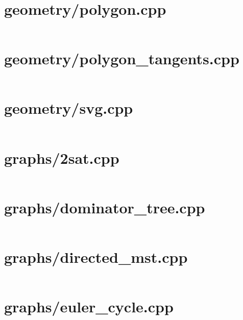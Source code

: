 \newpage
\section{geometry/polygon.cpp}
\fontsize{7.9}{8.5}\selectfont
\inputminted[numbersep=1pt,linenos,breaklines]{c++}{/home/ifsmirnov/olymp/teambook/tmp.qSsNloJNks/tmp.1aqEZOeitx}

\newpage
\section{geometry/polygon\_tangents.cpp}
\fontsize{7.9}{8.5}\selectfont
\inputminted[numbersep=1pt,linenos,breaklines]{c++}{/home/ifsmirnov/olymp/teambook/tmp.qSsNloJNks/tmp.QFuyYUMWu2}

\newpage
\section{geometry/svg.cpp}
\fontsize{7.9}{8.5}\selectfont
\inputminted[numbersep=1pt,linenos,breaklines]{c++}{/home/ifsmirnov/olymp/teambook/tmp.qSsNloJNks/tmp.mvL4qVBOg6}

\newpage
\section{graphs/2sat.cpp}
\fontsize{7.9}{8.5}\selectfont
\inputminted[numbersep=1pt,linenos,breaklines]{c++}{/home/ifsmirnov/olymp/teambook/tmp.qSsNloJNks/tmp.7ZDHbzrtuv}

\newpage
\section{graphs/dominator\_tree.cpp}
\fontsize{7.9}{8.5}\selectfont
\inputminted[numbersep=1pt,linenos,breaklines]{c++}{/home/ifsmirnov/olymp/teambook/tmp.qSsNloJNks/tmp.bocibUl543}

\newpage
\section{graphs/directed\_mst.cpp}
\fontsize{7.9}{8.5}\selectfont
\inputminted[numbersep=1pt,linenos,breaklines]{c++}{/home/ifsmirnov/olymp/teambook/tmp.qSsNloJNks/tmp.rKHbRagXpq}

\section{graphs/euler\_cycle.cpp}
\fontsize{7.9}{8.5}\selectfont
\inputminted[numbersep=1pt,linenos,breaklines]{c++}{/home/ifsmirnov/olymp/teambook/tmp.qSsNloJNks/tmp.5roo9K74jy}

